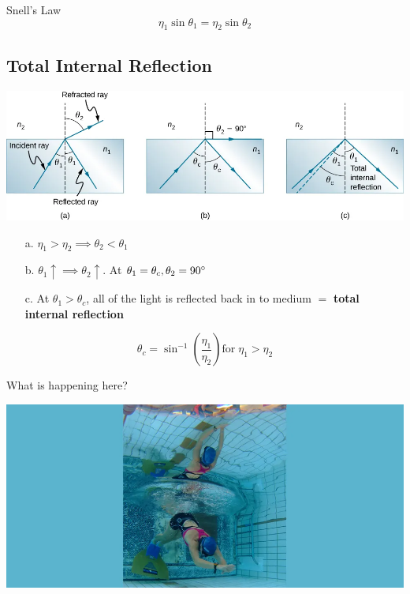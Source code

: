 \documentclass{beamer}
\begin{document}
\begin{frame}
\begin{block}{Snell's Law}
	\begin{displaymath}
		\eta_{1} \sin\theta_{1} = \eta_{2} \sin\theta_{2}
	\end{displaymath}
\end{block}
\end{frame}
\subsection{Total Internal Reflection}
\begin{frame}
	\begin{center}
		\includegraphics[scale=0.3]{28.png}
	\end{center}
	\begin{enumerate}
		\item[a.] $\eta_{1} > \eta_{2} \implies \theta_{2} < \theta_{1}$
		\item[b.]  $\theta_{1} \uparrow \implies \theta_{2} \uparrow $. At $\theta_{1} = \theta_{c}, \theta_{2} = 90\degree$
		\item[c.] At $\theta_{1} > \theta_{c}$, all of the light is reflected back in to medium $=$ \textbf{total internal reflection}  
	\end{enumerate}
	\begin{displaymath}
		\theta_{c} = \sin^{-1}\left( \frac{\eta_{1}}{\eta_{2}} \right) \text{for}\; \eta_{1} > \eta_{2}
	\end{displaymath}
\end{frame}
\begin{frame}{What is happening here?}
	\begin{center}
		\includegraphics[scale=0.3]{30.png}
	\end{center}
\end{frame}
\end{document}
